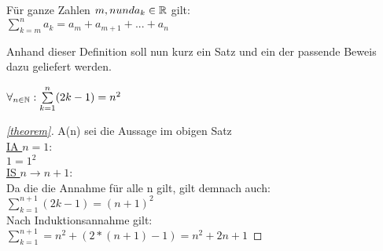\begin{df}[Summenschreibweise]
Für ganze Zahlen $m,n und a_k \in \mathbb{R}$ gilt: \\

$\sum\limits_{k=m}^{n}a_k = a_m + a_{m+1}+ ... + a_n$

\end{df}
Anhand dieser Definition soll nun kurz ein Satz und ein der passende Beweis dazu geliefert werden.
\begin{thm}\label{theorem}%

	
	$\forall _{n \in \mathbb{N}} : \sum\limits_{k=1}^{n}(2k-1) = n^2$

\end{thm}
\begin{proof}[\ref{theorem}]%
	A(n) sei die Aussage im obigen Satz \\
	\underline{IA $n=1$}: \\
	$1=1^2$ \\
	\underline{IS $n \rightarrow n+1$}: \\
	Da die die Annahme für alle n gilt, gilt demnach auch: 
	$\sum\limits_{k=1}^{n+1}(2k-1) = (n+1)^2$ \\
	Nach Induktionsannahme gilt: \\
	$\sum\limits_{k=1}^{n+1}= n^2+(2*(n+1)-1) = n^2+2n+1$
	



\end{proof}




